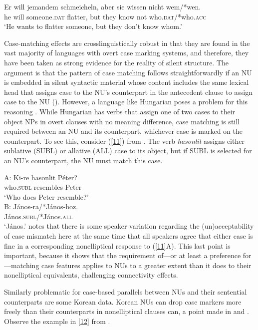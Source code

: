 \documentclass[output=paper
                ,modfonts
                ,nonflat
	        ,collection
	        ,collectionchapter
	        ,collectiontoclongg
 	        ,biblatex
                ,babelshorthands
                ,newtxmath
                ,draftmode
                ,colorlinks, citecolor=brown
]{./langsci/langscibook}
\begin{document}
{\ea
\gll Er will jemandem schmeicheln, aber sie wissen nicht wem/*wen.\\
he will someone.\textsc{dat} flatter, but they know not who.\textsc{dat}/*who.\textsc{acc}\\
\glt `He wants to flatter someone, but they don't know whom.'\label{10}\z


Case-matching effects are crosslinguistically robust in that they are found in the vast majority of languages with overt case marking systems, and therefore, they have been taken as strong evidence for the reality of silent structure. The argument is that the pattern of case matching follows straightforwardly if an NU is embedded in silent syntactic material whose content includes the same lexical head that assigns case to the NU's counterpart in the antecedent clause to assign case to the NU (\citet{Merchant2001, Merchant2005a}). However, a language like Hungarian poses a problem for this reasoning \citep{Jacobson2016}. While Hungarian has verbs that assign one of two cases to their object NPs in overt clauses with no meaning difference, case matching is still required between an NU and its counterpart, whichever case is marked on the counterpart. To see this, consider (\ref{11}) from \citet[356]{Jacobson2016}. The verb \emph{hasonlit} assigns either sublative (SUBL) or allative (ALL) case to its object, but if SUBL is selected for an NU's counterpart, the NU must match this case.

\ea
A: \gll Ki-re hasonlit P\'{e}ter?\\
 who.\textsc{subl} resembles Peter\\
 \glt  `Who does Peter resemble?'\\

B: \gll J\'{a}nos-ra/*J\'{a}nos-hoz.\\
J\'{a}nos.\textsc{subl}/*J\'{a}nos.\textsc{all}\\
\glt  `J\'{a}nos.'\label{11}\z
%
\citet{Jacobson2016} notes that there is some speaker variation regarding the (un)ac\-cepta\-bi\-li\-ty of case mismatch here at the same time that all speakers agree that either case is fine in a corresponding nonelliptical response to (\ref{11}A). This last point is important, because it shows that the requirement of---or at least a preference for---matching case features applies to NUs to a greater extent than it does to their nonelliptical equivalents, challenging connectivity effects.

Similarly problematic for case-based parallels between NUs and their sentential counterparts are some Korean data. Korean NUs can drop case markers more freely than their counterparts in nonelliptical clauses can, a point made in \citet{Morgan1989} and \citet{Kim2015}. Observe the example in \ref{12} from \citet[237]{Morgan1989}.

}
\end{document}
